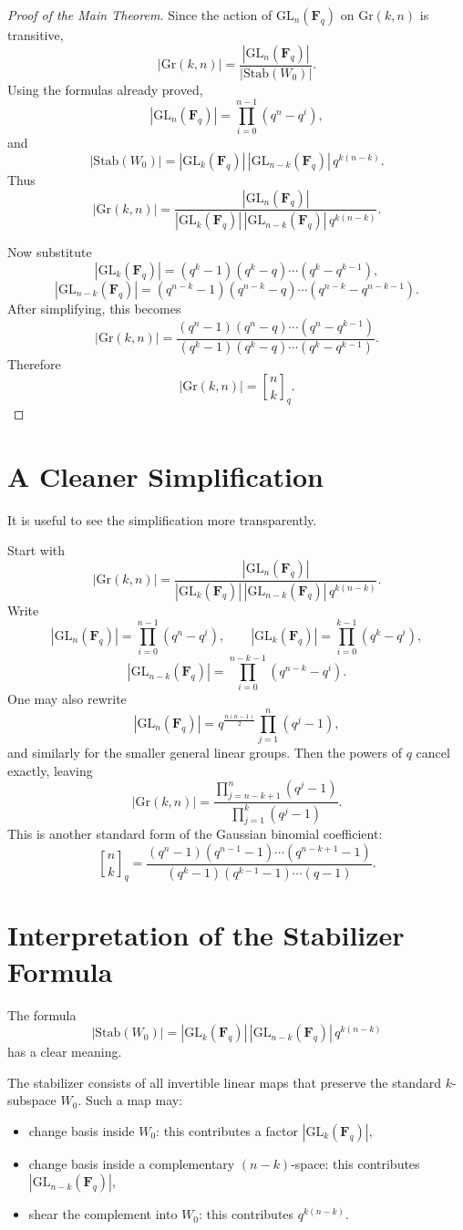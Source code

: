 \documentclass[11pt]{article}
\theoremstyle{definition}
\theoremstyle{remark}
\newcommand{\F}{\mathbf{F}}
\newcommand{\GL}{\mathrm{GL}}
\newcommand{\Gr}{\mathrm{Gr}}
\newcommand{\Stab}{\mathrm{Stab}}
\newcommand{\qbinom}[2]{\genfrac{[}{]}{0pt}{}{#1}{#2}_q}
\begin{document}
	\begin{proof}[Proof of the Main Theorem]
		Since the action of \(\GL_n(\F_q)\) on \(\Gr(k,n)\) is transitive,
		\[
		|\Gr(k,n)|=\frac{|\GL_n(\F_q)|}{|\Stab(W_0)|}.
		\]
		Using the formulas already proved,
		\[
		|\GL_n(\F_q)|
		=
		\prod_{i=0}^{n-1}(q^n-q^i),
		\]
		and
		\[
		|\Stab(W_0)|
		=
		|\GL_k(\F_q)|\,|\GL_{n-k}(\F_q)|\,q^{k(n-k)}.
		\]
		Thus
		\[
		|\Gr(k,n)|
		=
		\frac{|\GL_n(\F_q)|}{|\GL_k(\F_q)|\,|\GL_{n-k}(\F_q)|\,q^{k(n-k)}}.
		\]
		
		Now substitute
		\[
		|\GL_k(\F_q)|=(q^k-1)(q^k-q)\cdots(q^k-q^{k-1}),
		\]
		\[
		|\GL_{n-k}(\F_q)|=(q^{n-k}-1)(q^{n-k}-q)\cdots(q^{n-k}-q^{n-k-1}).
		\]
		After simplifying, this becomes
		\[
		|\Gr(k,n)|
		=
		\frac{(q^n-1)(q^n-q)\cdots(q^n-q^{k-1})}
		{(q^k-1)(q^k-q)\cdots(q^k-q^{k-1})}.
		\]
		Therefore
		\[
		|\Gr(k,n)|=\qbinom{n}{k}.
		\]
	\end{proof}
	
	\section{A Cleaner Simplification}
	
	It is useful to see the simplification more transparently.
	
	Start with
	\[
	|\Gr(k,n)|=\frac{|\GL_n(\F_q)|}{|\GL_k(\F_q)|\,|\GL_{n-k}(\F_q)|\,q^{k(n-k)}}.
	\]
	Write
	\[
	|\GL_n(\F_q)|=\prod_{i=0}^{n-1}(q^n-q^i),
	\qquad
	|\GL_k(\F_q)|=\prod_{i=0}^{k-1}(q^k-q^i),
	\]
	\[
	|\GL_{n-k}(\F_q)|=\prod_{i=0}^{n-k-1}(q^{n-k}-q^i).
	\]
	One may also rewrite
	\[
	|\GL_n(\F_q)|=q^{\frac{n(n-1)}{2}}\prod_{j=1}^n(q^j-1),
	\]
	and similarly for the smaller general linear groups. Then the powers of \(q\) cancel exactly, leaving
	\[
	|\Gr(k,n)|
	=
	\frac{\prod_{j=n-k+1}^n(q^j-1)}{\prod_{j=1}^k(q^j-1)}.
	\]
	This is another standard form of the Gaussian binomial coefficient:
	\[
	\qbinom{n}{k}
	=
	\frac{(q^n-1)(q^{n-1}-1)\cdots(q^{n-k+1}-1)}
	{(q^k-1)(q^{k-1}-1)\cdots(q-1)}.
	\]
	
	\section{Interpretation of the Stabilizer Formula}
	
	The formula
	\[
	|\Stab(W_0)|=|\GL_k(\F_q)|\,|\GL_{n-k}(\F_q)|\,q^{k(n-k)}
	\]
	has a clear meaning.
	
	The stabilizer consists of all invertible linear maps that preserve the standard \(k\)-subspace \(W_0\). Such a map may:
	\begin{itemize}
		\item change basis inside \(W_0\): this contributes a factor \(|\GL_k(\F_q)|\),
		\item change basis inside a complementary \((n-k)\)-space: this contributes \(|\GL_{n-k}(\F_q)|\),
		\item shear the complement into \(W_0\): this contributes \(q^{k(n-k)}\).
	\end{itemize}
	
\end{document}
